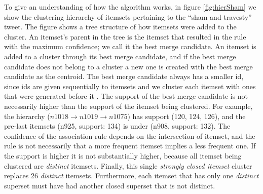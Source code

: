\documentclass[letterpaper,12pt,titlepage,oneside,final]{book}
\begin{document}
To give an understanding of how the algorithm works,
in figure \ref{fig:hierSham} we show the clustering hierarchy of itemsets pertaining to
the ``sham and travesty'' tweet.
The figure shows a tree structure of how itemsets 
were added to the cluster.
An itemset's parent in the tree is the itemset
that resulted in the rule with the maximum confidence;
we call it the best merge candidate.
An itemset is added to a cluster
through its best merge candidate, 
and if the best merge candidate 
does not belong to a cluster
a new one is created with 
the best merge candidate as the centroid.
The best merge candidate always has a smaller id, 
since ids are given sequentially to itemsets 
and we cluster each itemset with ones that were
generated before it .
The support of the best merge candidate is not necessarily higher than
the support of the itemset being clustered.
For example, the hierarchy ($n1018 \rightarrow n1019 \rightarrow n1075$)
has support (120, 124, 126), and
the pre-last itemsets (n925, support: 134) is 
under (n908, support: 132).
The confidence of the association rule
depends on the intersection of itemset,
and the rule is not necessarily that
a more frequent itemset implies
a less frequent one.
If the support is higher it is not substantially higher,
because all itemset being clustered are \emph{distinct} itemsets. 
Finally, this single \emph{strongly closed itemset} cluster 
replaces 26  \emph{distinct} itemsets. 
Furthermore, each itemset that has only one 
\emph{distinct} superset must have had 
another closed superset that is not distinct.
\end{document}
